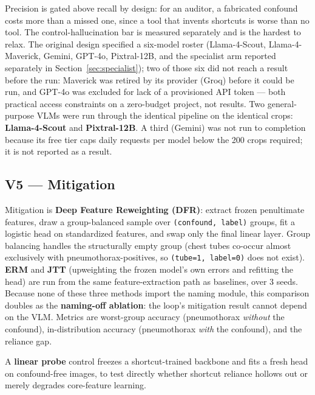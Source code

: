 \documentclass{ieeeaccess}
\begin{document}
Precision is gated above recall by design: for an auditor, a fabricated confound costs more than a missed one, since a tool that invents shortcuts is worse than no tool. The control-hallucination bar is measured separately and is the hardest to relax. The original design specified a six-model roster (Llama-4-Scout, Llama-4-Maverick, Gemini, GPT-4o, Pixtral-12B, and the specialist arm reported separately in Section~\ref{sec:specialist}); two of those six did not reach a result before the run: Maverick was retired by its provider (Groq) before it could be run, and GPT-4o was excluded for lack of a provisioned API token --- both practical access constraints on a zero-budget project, not results. Two general-purpose VLMs were run through the identical pipeline on the identical crops: \textbf{Llama-4-Scout} and \textbf{Pixtral-12B}. A third (Gemini) was not run to completion because its free tier caps daily requests per model below the 200 crops required; it is not reported as a result.

\subsection{V5 --- Mitigation}
Mitigation is \textbf{Deep Feature Reweighting (DFR)}: extract frozen penultimate features, draw a group-balanced sample over \texttt{(confound, label)} groups, fit a logistic head on standardized features, and swap only the final linear layer. Group balancing handles the structurally empty group (chest tubes co-occur almost exclusively with pneumothorax-positives, so \texttt{(tube=1, label=0)} does not exist). \textbf{ERM} and \textbf{JTT} (upweighting the frozen model's own errors and refitting the head) are run from the same feature-extraction path as baselines, over 3 seeds. Because none of these three methods import the naming module, this comparison doubles as the \textbf{naming-off ablation}: the loop's mitigation result cannot depend on the VLM. Metrics are worst-group accuracy (pneumothorax \emph{without} the confound), in-distribution accuracy (pneumothorax \emph{with} the confound), and the reliance gap.

A \textbf{linear probe} control freezes a shortcut-trained backbone and fits a fresh head on confound-free images, to test directly whether shortcut reliance hollows out or merely degrades core-feature learning.
\end{document}
